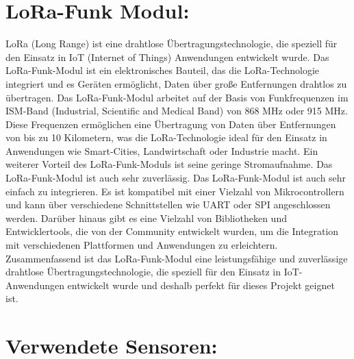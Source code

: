 \section{LoRa-Funk Modul:}
LoRa (Long Range) ist eine drahtlose Übertragungstechnologie, die speziell für den Einsatz in IoT (Internet of Things) Anwendungen entwickelt wurde. 
Das LoRa-Funk-Modul ist ein elektronisches Bauteil, das die LoRa-Technologie integriert und es Geräten ermöglicht, Daten über große Entfernungen drahtlos zu übertragen. 
Das LoRa-Funk-Modul arbeitet auf der Basis von Funkfrequenzen im ISM-Band (Industrial, Scientific and Medical Band) von 868 MHz oder 915 MHz. 
Diese Frequenzen ermöglichen eine Übertragung von Daten über Entfernungen von bis zu 10 Kilometern, was die LoRa-Technologie ideal für den Einsatz in Anwendungen wie Smart-Cities, Landwirtschaft oder Industrie macht. 
Ein weiterer Vorteil des LoRa-Funk-Moduls ist seine geringe Stromaufnahme.
Das LoRa-Funk-Modul ist auch sehr zuverlässig. 
Das LoRa-Funk-Modul ist auch sehr einfach zu integrieren. Es ist kompatibel mit einer Vielzahl von Mikrocontrollern und kann über verschiedene Schnittstellen wie UART oder SPI angeschlossen werden. 
Darüber hinaus gibt es eine Vielzahl von Bibliotheken und Entwicklertools, die von der Community entwickelt wurden, um die Integration mit verschiedenen Plattformen und Anwendungen zu erleichtern. 
\newline 
Zusammenfassend ist das LoRa-Funk-Modul eine leistungsfähige und zuverlässige drahtlose Übertragungstechnologie, die speziell für den Einsatz in IoT-Anwendungen entwickelt wurde und deshalb perfekt für dieses Projekt geignet ist.


\newpage
\section{Verwendete Sensoren:}
